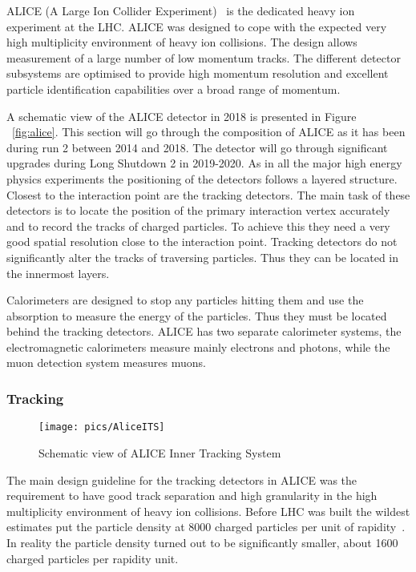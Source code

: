 ALICE (A Large Ion Collider Experiment)~\cite{ALICE} is the dedicated heavy ion experiment at the LHC. ALICE was designed to cope with the expected very high multiplicity environment of heavy ion collisions. The design allows measurement of a large number of low momentum tracks. The different detector subsystems are optimised to provide high momentum resolution and excellent particle identification capabilities over a broad range of momentum.

A schematic view of the ALICE detector in 2018 is presented in Figure ~\ref{fig:alice}. This section will go through the composition of ALICE as it has been during run 2 between 2014 and 2018. The detector will go through significant upgrades during Long Shutdown 2 in 2019-2020. As in all the major high energy physics experiments the positioning of the detectors follows a layered structure. Closest to the interaction point are the tracking detectors. The main task of these detectors is to locate the position of the primary interaction vertex accurately and to record the tracks of charged particles. To achieve this they need a very good spatial resolution close to the interaction point. Tracking detectors do not significantly alter the tracks of traversing particles. Thus they can be located in the innermost layers.

Calorimeters are designed to stop any particles hitting them and use the absorption to measure the energy of the particles. Thus they must be located behind the tracking detectors. ALICE has two separate calorimeter systems, the electromagnetic calorimeters measure mainly electrons and photons, while the muon detection system measures muons.


\subsubsection{Tracking}
\begin{figure}[htb]
\centering
\texttt{[image: pics/AliceITS]}
\caption[ITS]{Schematic view of ALICE Inner Tracking System}
\label{fig:its}
\end{figure}


The main design guideline for the tracking detectors in ALICE was the requirement to have good track separation and high granularity in the high multiplicity environment of heavy ion collisions. Before LHC was built the wildest estimates put the particle density at 8000 charged particles per unit of rapidity~\cite{}. In reality the particle density turned out to be significantly smaller, about 1600 charged particles per rapidity unit.~\cite{}

